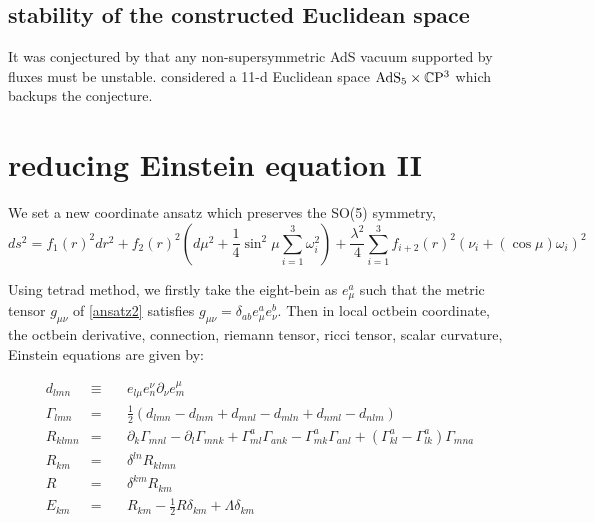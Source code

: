 \documentclass[12pt, a4paper]{article}
\numberwithin{equation}{section}
\newcommand{\be}{\begin{equation}}
\newcommand{\ee}{\end{equation}}
\begin{document}
\subsection{stability of the constructed Euclidean space}

	It was conjectured by \cite{Ooguri:2017as} that any non-supersymmetric AdS vacuum supported by fluxes must be unstable. \cite{Ooguri:2017av} considered a 11-d Euclidean space ${\rm AdS}_5\times \mathbb{C}{\rm P}^3$ which backups the conjecture.

\section{reducing Einstein equation II}
	We set a new coordinate ansatz which preserves the SO(5) symmetry,
\be
ds^2 = f_1(r)^2 dr^2 + f_2(r)^2 \left(d\mu^2 +\frac{1}{4}\sin^2\mu \sum\limits_{i=1}^3 \omega_i^2\right) + \frac{\lambda^2}{4}\sum\limits_{i=1}^3 f_{i+2}(r)^2(\nu_i + (\cos\mu)\omega_i)^2
\label{ansatz2}
\ee	

	Using tetrad method, we firstly take the eight-bein as $e^a_\mu$ such that the metric tensor $g_{\mu\nu}$ of \ref{ansatz2} satisfies $g_{\mu\nu} = \delta_{ab}e^a_\mu e^b_\nu$. Then in local octbein coordinate, the octbein derivative, connection, riemann tensor, ricci tensor, scalar curvature, Einstein equations are given by:\cite{Andy}
	
\be
\begin{aligned}
	&d_{lmn} &\equiv& \quad e_{l\mu} e_n^\nu \partial_\nu e_m^\mu&\\
	&\Gamma_{lmn} &=&\quad  \frac{1}{2}(d_{lmn} - d_{lnm} + d_{mnl} - d_{mln} + d_{nml} - d_{nlm})&\\
	&R_{klmn} &=&\quad  \partial_k \Gamma_{mnl} - \partial_l\Gamma_{mnk} + \Gamma^a_{ml}\Gamma_{ank} - \Gamma^a_{mk}\Gamma_{anl} + (\Gamma^a_{kl} - \Gamma^a_{lk})\Gamma_{mna}&\\
	&R_{km} &=&\quad  \delta^{ln}R_{klmn}&\\
	&R &=&\quad  \delta^{km}R_{km}&\\
	&E_{km} &=&\quad  R_{km} - \frac{1}{2}R\delta_{km} + \Lambda \delta_{km}&\\
\end{aligned}
\ee
\end{document}
